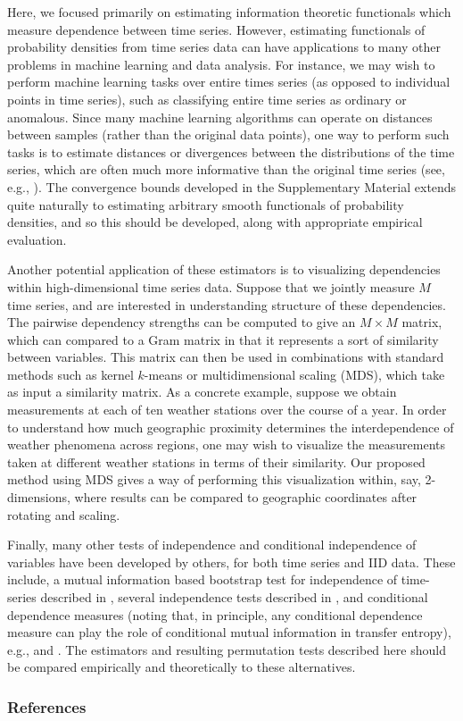 \documentclass{article} %
\begin{document}
Here, we focused primarily on estimating information theoretic functionals
which measure dependence between time series. However, estimating functionals
of probability densities from time series data can have applications to many
other problems in machine learning and data analysis. For instance, we may wish
to perform machine learning tasks over entire times series (as opposed to
individual points in time series), such as classifying entire time series as
ordinary or anomalous. Since many machine learning algorithms can operate on
distances between samples (rather than the original data points), one way to
perform such tasks is to estimate distances or divergences between the
distributions of the time series, which are often much more informative than
the original time series (see, e.g., \citet{poczos12learningOnDists}). The
convergence bounds developed in the Supplementary Material extends quite
naturally to estimating arbitrary smooth functionals of probability densities,
and so this should be developed, along with appropriate empirical evaluation.

Another potential application of these estimators is to visualizing
dependencies within high-dimensional time series data. Suppose that we jointly
measure $M$ time series, and are interested in understanding structure of these
dependencies. The pairwise dependency strengths can be computed to give an
$M \times M$ matrix, which can compared to a Gram matrix in that it represents
a sort of similarity between variables. This matrix can then be used in
combinations with standard methods such as kernel $k$-means or multidimensional
scaling (MDS), which take as input a similarity matrix.
As a concrete example, suppose we obtain measurements at each of ten weather
stations over the course of a year. In order to understand how much geographic
proximity determines the interdependence of weather phenomena across regions,
one may wish to visualize the measurements taken at different weather stations
in terms of their similarity. Our proposed method using MDS gives a way of
performing this visualization within, say, 2-dimensions, where results can be
compared to geographic coordinates after rotating and scaling.

Finally, many other tests of independence and conditional independence of
variables have been developed by others, for both time series and IID data.
These include, a mutual information based bootstrap test for independence of
time-series described in \cite{wu09bootstrapMI}, several independence tests
described in \citep{gretton10nonparametricIndependence}, and conditional
dependence measures (noting that, in principle, any conditional dependence
measure can play the role of conditional mutual information in transfer
entropy), e.g., \citep{bergsma10nonparametric} and \citep{zhang12kernel}. The
estimators and resulting permutation tests described here should be compared
empirically and theoretically to these alternatives.

\subsubsection*{References}
\setlength{\bibsep}{0.0pt}
{


}
\end{document}
